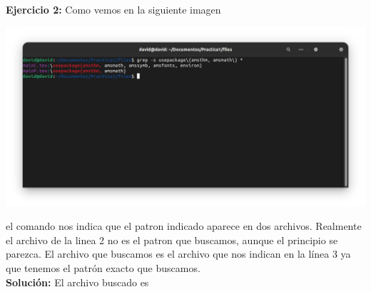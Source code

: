\documentclass[12pt]{article}
\author{David }
\begin{document}
    \textbf{Ejercicio 2: }Como vemos en la siguiente imagen\\
    \begin{center}
        \includegraphics[width=15cm]{img2.png}
    \end{center}
    el comando nos indica que el patron indicado aparece en dos archivos. Realmente el archivo de la linea 2 no es el patron que buscamos, aunque el principio se parezca. El archivo que buscamos es el archivo que nos indican en la línea 3 ya que tenemos el patrón exacto que buscamos.\\ 

    \textbf{Solución: }El archivo buscado es 
    
\end{document}
